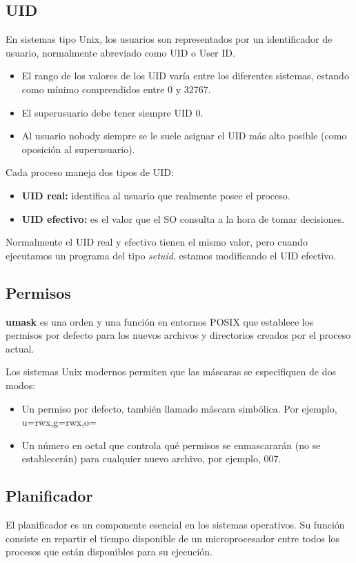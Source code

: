 \subsection{UID}
En sistemas tipo Unix, los usuarios son representados por un identificador de usuario, normalmente abreviado como UID o User ID.
\begin{itemize}
    \item El rango de los valores de los UID varía entre los diferentes sistemas, estando como mínimo comprendidos entre 0 y 32767.
    \item El superusuario debe tener siempre UID 0.
    \item Al usuario nobody siempre se le suele asignar el UID más alto posible (como oposición al superusuario).
\end{itemize}
 Cada proceso maneja dos tipos de UID:
 \begin{itemize}
    \item \textbf{UID real: }identifica al usuario que realmente posee el proceso.
    \item \textbf{UID efectivo: }es el valor que el SO consulta a la hora de tomar decisiones.
 \end{itemize}
 Normalmente el UID real y efectivo tienen el mismo valor, pero cuando ejecutamos un programa del tipo \textit{setuid}, estamos modificando el UID efectivo.
\subsection{Permisos}
\textbf{umask} es una orden y una función en entornos POSIX que establece los permisos por defecto para los nuevos archivos y directorios creados por el proceso actual.

Los sistemas Unix modernos permiten que las máscaras se especifiquen de dos modos:
\begin{itemize}
    \item Un permiso por defecto, también llamado máscara simbólica. Por ejemplo, u=rwx,g=rwx,o=
    \item Un número en octal que controla qué permisos se enmascararán (no se establecerán) para cualquier nuevo archivo, por ejemplo, 007.
\end{itemize}


\subsection{Planificador}
El planificador es un componente esencial en los sistemas operativos. Su función consiste en repartir el tiempo disponible de un microprocesador entre todos los procesos que están disponibles para su ejecución.\\

